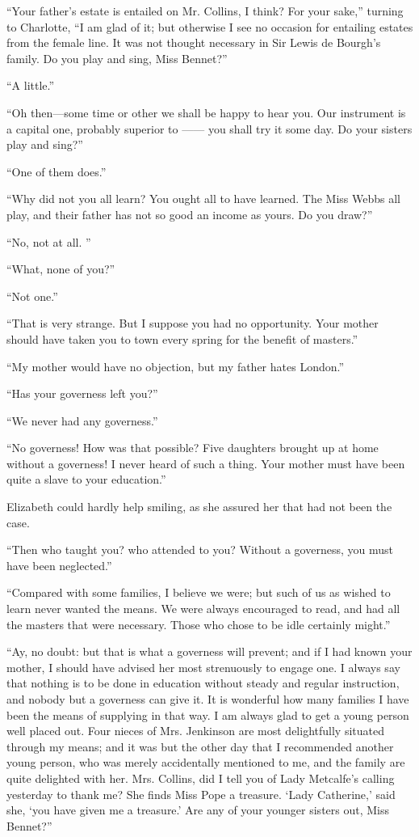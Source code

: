 \documentclass[10pt]{book}
\begin{document}
   “Your father’s estate is entailed on Mr. Collins, I think? For your
sake,” turning to Charlotte, “I am glad of it; but otherwise I see no
occasion for entailing estates from the female line. It was not thought
necessary in Sir Lewis de Bourgh’s family. Do you play and sing, Miss
Bennet?”
  

   “A little.”
  

   “Oh then—some time or other we shall be happy to hear you. Our
instrument is a capital one, probably superior to —— you shall try it
some day. Do your sisters play and sing?”
  

   “One of them does.”
  

   “Why did not you all learn? You ought all to have learned. The Miss
Webbs all play, and their father has not so good an income as yours. Do
you draw?”
  

   “No, not at all.
   ”
  

   “What, none of you?”
  

   “Not one.”
  

   “That is very strange. But I suppose you had no opportunity. Your mother
should have taken you to town every spring for the benefit of masters.”
  

   “My mother would have no objection, but my father hates London.”
  

   “Has your governess left you?”
  

   “We never had any governess.”
  

   “No governess! How was that possible? Five daughters brought up at home
without a governess! I never heard of such a thing. Your mother must
have been quite a slave to your education.”
  

   Elizabeth could hardly help smiling, as she assured her that had not
been the case.
  

   “Then who taught you? who attended to you? Without a governess, you must
have been neglected.”
  

   “Compared with some families, I believe we were; but such of us as
wished to learn never wanted the means. We were always encouraged to
read, and had all the masters that were necessary. Those who chose to be
idle certainly might.”
  

   “Ay, no doubt: but that is what a governess will prevent; and if I had
known your mother, I should have advised her most strenuously to engage
one. I always say that nothing is to be done in education without steady
and regular instruction, and nobody but a governess can give it. It is
wonderful how many families I have been the means of supplying in that
way. I am always glad to get a young person well placed out. Four nieces
of Mrs. Jenkinson are most delightfully situated through my means; and
it was but the other day that I recommended another young person, who
was
   merely accidentally mentioned to me, and the family are quite
delighted with her. Mrs. Collins, did I tell you of Lady Metcalfe’s
calling yesterday to thank me? She finds Miss Pope a treasure. ‘Lady
Catherine,’ said she, ‘you have given me a treasure.’ Are any of your
younger sisters out, Miss Bennet?”
  
\end{document}
